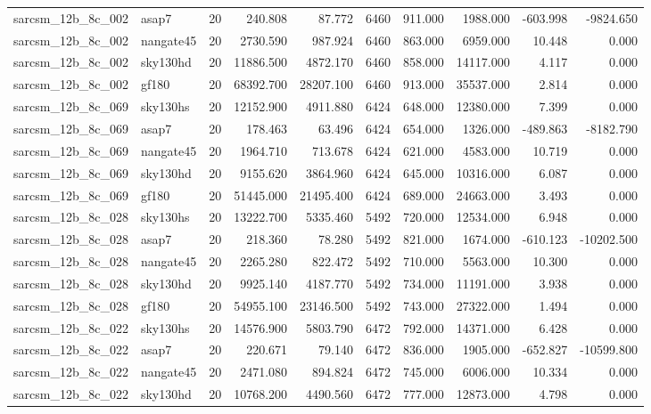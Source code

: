 \begin{longtable}{llrrrrrrrr}
sarcsm\_12b\_8c\_002 & asap7 & 20 & 240.808 & 87.772 & 6460 & 911.000 & 1988.000 & -603.998 & -9824.650 \\
sarcsm\_12b\_8c\_002 & nangate45 & 20 & 2730.590 & 987.924 & 6460 & 863.000 & 6959.000 & 10.448 & 0.000 \\
sarcsm\_12b\_8c\_002 & sky130hd & 20 & 11886.500 & 4872.170 & 6460 & 858.000 & 14117.000 & 4.117 & 0.000 \\
sarcsm\_12b\_8c\_002 & gf180 & 20 & 68392.700 & 28207.100 & 6460 & 913.000 & 35537.000 & 2.814 & 0.000 \\
sarcsm\_12b\_8c\_069 & sky130hs & 20 & 12152.900 & 4911.880 & 6424 & 648.000 & 12380.000 & 7.399 & 0.000 \\
sarcsm\_12b\_8c\_069 & asap7 & 20 & 178.463 & 63.496 & 6424 & 654.000 & 1326.000 & -489.863 & -8182.790 \\
sarcsm\_12b\_8c\_069 & nangate45 & 20 & 1964.710 & 713.678 & 6424 & 621.000 & 4583.000 & 10.719 & 0.000 \\
sarcsm\_12b\_8c\_069 & sky130hd & 20 & 9155.620 & 3864.960 & 6424 & 645.000 & 10316.000 & 6.087 & 0.000 \\
sarcsm\_12b\_8c\_069 & gf180 & 20 & 51445.000 & 21495.400 & 6424 & 689.000 & 24663.000 & 3.493 & 0.000 \\
sarcsm\_12b\_8c\_028 & sky130hs & 20 & 13222.700 & 5335.460 & 5492 & 720.000 & 12534.000 & 6.948 & 0.000 \\
sarcsm\_12b\_8c\_028 & asap7 & 20 & 218.360 & 78.280 & 5492 & 821.000 & 1674.000 & -610.123 & -10202.500 \\
sarcsm\_12b\_8c\_028 & nangate45 & 20 & 2265.280 & 822.472 & 5492 & 710.000 & 5563.000 & 10.300 & 0.000 \\
sarcsm\_12b\_8c\_028 & sky130hd & 20 & 9925.140 & 4187.770 & 5492 & 734.000 & 11191.000 & 3.938 & 0.000 \\
sarcsm\_12b\_8c\_028 & gf180 & 20 & 54955.100 & 23146.500 & 5492 & 743.000 & 27322.000 & 1.494 & 0.000 \\
sarcsm\_12b\_8c\_022 & sky130hs & 20 & 14576.900 & 5803.790 & 6472 & 792.000 & 14371.000 & 6.428 & 0.000 \\
sarcsm\_12b\_8c\_022 & asap7 & 20 & 220.671 & 79.140 & 6472 & 836.000 & 1905.000 & -652.827 & -10599.800 \\
sarcsm\_12b\_8c\_022 & nangate45 & 20 & 2471.080 & 894.824 & 6472 & 745.000 & 6006.000 & 10.334 & 0.000 \\
sarcsm\_12b\_8c\_022 & sky130hd & 20 & 10768.200 & 4490.560 & 6472 & 777.000 & 12873.000 & 4.798 & 0.000 \\

\end{longtable}
